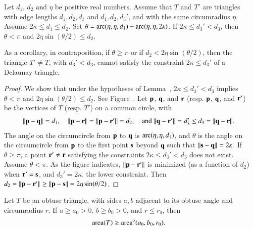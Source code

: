\begin{lemma}  
  Let $d_1$, $d_2$ and $\eta$ be positive real numbers.  Assume that
  $T$ and $T'$ are triangles with edge lengths $d_1,d_2,d_3$ and
  $d_1,d_2,d_3'$, and with the same circumradius $\eta$. Assume
  $2\kappa\le d_1\le d_2$.  Set $\theta =
  \operatorname{arc}(\eta,\eta,d_1)+\operatorname{arc}(\eta,\eta,2\kappa)$.  If $2\kappa \le d_3'
  < d_3$, then $\theta < \pi$ and $2\eta\sin(\theta/2) \le d_2$.
\end{lemma}

As a corollary, 
in contraposition, if $\theta\ge\pi$ or if $d_2 < 2\eta\sin(\theta/2)$,
then the triangle $T'\ne T$, with $d_3' < d_3$,
cannot satisfy the constraint $2\kappa\le d_3'$ of a  Delaunay triangle.

\begin{proof}
  We show that under the hypotheses of Lemma~,
  $2\kappa\le d_3'<d_3$ implies $\theta<\pi$ and
  $2\eta\sin(\theta/2)\le d_2$. See Figure~.  Let ${\mathbf p}$, ${\mathbf q}$, and ${\mathbf r}$ (resp. ${\mathbf p}$,
  ${\mathbf q}$, and ${\mathbf r}'$) be the vertices of $T$ (resp. $T'$) on a common
  circle, with
\[
\norm{\p}{\q} =d_1, 
\quad\norm{\p}{\r}=\norm{\p}{\r'}=d_2, \quad\text{and } 
\norm{\q}{\r'} = d_3' \le d_3=\norm{\q}{\r}.
\]
The angle on the circumcircle from ${\mathbf p}$ to ${\mathbf q}$ is
$\operatorname{arc}(\eta,\eta,d_1)$, and $\theta$ is the angle on the circumcircle
from ${\mathbf p}$ to the first point ${\mathbf s}$ beyond ${\mathbf q}$ such that
$\norm{\s}{\q}=2\kappa$.  If $\theta\ge\pi$, a point ${\mathbf r}'\ne {\mathbf r}$
satisfying the constraints $2\kappa\le d_3'<d_3$ does not exist.  Assume $\theta < \pi$.  As
the figure indicates, $\norm{\p}{\r'}$ is minimized (as a function of
$d_2$) when ${\mathbf r}'={\mathbf s}$, and $d_3' = 2\kappa$, the lower constraint.
Then $d_2 = \norm{\p}{\r'}\ge \norm{\p}{\s}= 2\eta\sin(\theta/2)$.
\end{proof}


\begin{lemma}
  Let $T$ be an obtuse triangle, with sides $a,b$ adjacent to its
  obtuse angle and circumradius $r$.  If $a\ge a_0>0$,
  $b\ge b_0>0$, and $r\le r_0$, then
  \[
  {\operatorname{area}}(T)\ge{\operatorname{area}}^\circ(a_0,b_0,r_0).
  \]
\end{lemma}

